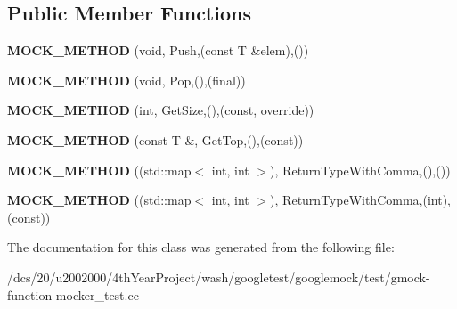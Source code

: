 \subsection*{Public Member Functions}
\begin{DoxyCompactItemize}
\item 
\mbox{\label{classtesting_1_1gmock__function__mocker__test_1_1MockStack_a1012c16764c3ca2626032cd95d6c5f89}} 
{\bfseries M\+O\+C\+K\+\_\+\+M\+E\+T\+H\+OD} (void, Push,(const T \&elem),())
\item 
\mbox{\label{classtesting_1_1gmock__function__mocker__test_1_1MockStack_ae54b445bc4d2dd18520449e5edee0771}} 
{\bfseries M\+O\+C\+K\+\_\+\+M\+E\+T\+H\+OD} (void, Pop,(),(final))
\item 
\mbox{\label{classtesting_1_1gmock__function__mocker__test_1_1MockStack_a4283f356c5153e7e2eea0aeb424a61be}} 
{\bfseries M\+O\+C\+K\+\_\+\+M\+E\+T\+H\+OD} (int, Get\+Size,(),(const, override))
\item 
\mbox{\label{classtesting_1_1gmock__function__mocker__test_1_1MockStack_a17b01e582dc3c138e202c29ae9aec247}} 
{\bfseries M\+O\+C\+K\+\_\+\+M\+E\+T\+H\+OD} (const T \&, Get\+Top,(),(const))
\item 
\mbox{\label{classtesting_1_1gmock__function__mocker__test_1_1MockStack_ae0e6e3d10e20435b40308a5c3dd4cc9d}} 
{\bfseries M\+O\+C\+K\+\_\+\+M\+E\+T\+H\+OD} ((std\+::map$<$ int, int $>$), Return\+Type\+With\+Comma,(),())
\item 
\mbox{\label{classtesting_1_1gmock__function__mocker__test_1_1MockStack_acecb9a897885e7847da425933c9cbc1d}} 
{\bfseries M\+O\+C\+K\+\_\+\+M\+E\+T\+H\+OD} ((std\+::map$<$ int, int $>$), Return\+Type\+With\+Comma,(int),(const))
\end{DoxyCompactItemize}


The documentation for this class was generated from the following file\+:\begin{DoxyCompactItemize}
\item 
/dcs/20/u2002000/4th\+Year\+Project/wash/googletest/googlemock/test/gmock-\/function-\/mocker\+\_\+test.\+cc\end{DoxyCompactItemize}
